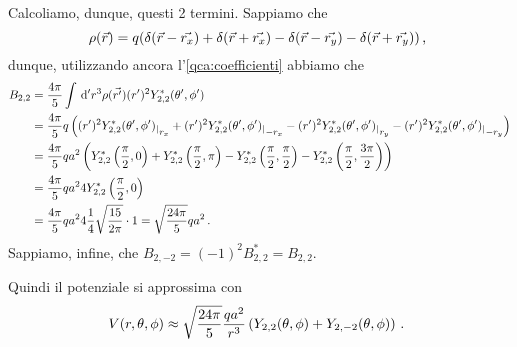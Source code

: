 \documentclass[../main.tex]{subfiles}
\begin{document}
Calcoliamo, dunque, questi 2 termini. Sappiamo che
\[
	\rho(\vec{r})=q(\delta(\vec{r}-\vec{r_x})+\delta(\vec{r}+\vec{r_x})-\delta(\vec{r}-\vec{r_y})-\delta(\vec{r}+\vec{r_y}))\, \text{, }
\]
dunque, utilizzando ancora l'\cref{qca:coefficienti} abbiamo che
\begin{align*}
	B_{2,2}&=\frac{4\pi}{5}\int \,\mathrm d'r^3 \rho(\vec{r'})(r')^2 Y_{2,2}^*(\theta',\phi')\\
		&=\frac{4\pi}{5} q\left( (r')^2 {Y_{2,2}^*(\theta',\phi')_\arrowvert}_{r_x}+(r')^2 {Y_{2,2}^*(\theta',\phi')_\arrowvert}_{-r_x}-(r')^2 {Y_{2,2}^*(\theta',\phi')_\arrowvert}_{r_y}-(r')^2 {Y_{2,2}^*(\theta',\phi')_\arrowvert}_{-r_y}\right)\\
		&=\frac{4\pi}{5} qa^2\left( Y_{2,2}^*\left(\frac{\pi}{2},0\right)+Y_{2,2}^*\left(\frac{\pi}{2},\pi\right)-Y_{2,2}^*\left(\frac{\pi}{2},\frac{\pi}{2}\right)-Y_{2,2}^*\left(\frac{\pi}{2},\frac{3\pi}{2}\right)\right)\\
		&=\frac{4\pi}{5} qa^2 4 Y_{2,2}^*\left(\frac{\pi}{2},0\right)\\
		&=\frac{4\pi}{5} qa^2 4 \frac{1}{4} \sqrt{\frac{15}{2\pi}} \cdot 1 = \sqrt{\frac{24\pi}{5}} qa^2\, \text{. }
\end{align*}
Sappiamo, infine, che $B_{2,-2}=(-1)^2 B_{2,2}^*=B_{2,2}$.

Quindi il potenziale si approssima con
\[
	V(r,\theta,\phi)\approx \sqrt{\frac{24\pi}{5}} \frac{qa^2}{r^{3}}\left( Y_{2,2}(\theta,\phi)+Y_{2,-2}(\theta,\phi)\right)\, \text{. }
\]
\end{document}
